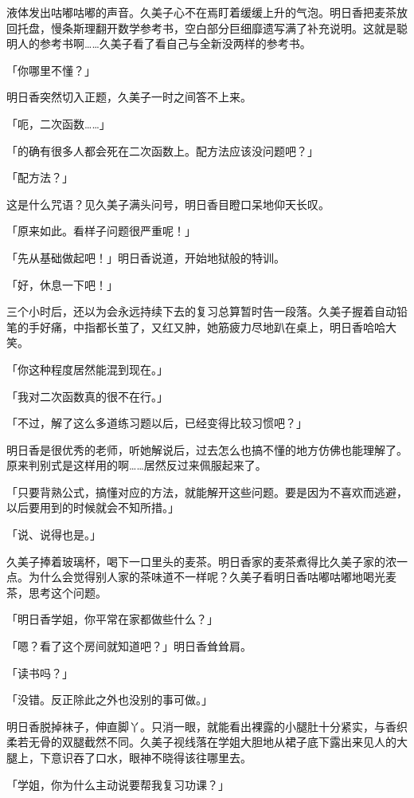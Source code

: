 \documentclass[UTF8]{ctexart}
\begin{document}
    液体发出咕嘟咕嘟的声音。久美子心不在焉盯着缓缓上升的气泡。明日香把麦茶放回托盘，慢条斯理翻开数学参考书，空白部分巨细靡遗写满了补充说明。这就是聪明人的参考书啊……久美子看了看自己与全新没两样的参考书。 

    「你哪里不懂？」 

    明日香突然切入正题，久美子一时之间答不上来。 

    「呃，二次函数……」 

    「的确有很多人都会死在二次函数上。配方法应该没问题吧？」 

    「配方法？」 

    这是什么咒语？见久美子满头问号，明日香目瞪口呆地仰天长叹。 

    「原来如此。看样子问题很严重呢！」 

    「先从基础做起吧！」明日香说道，开始地狱般的特训。 

    「好，休息一下吧！」 

    三个小时后，还以为会永远持续下去的复习总算暂时告一段落。久美子握着自动铅笔的手好痛，中指都长茧了，又红又肿，她筋疲力尽地趴在桌上，明日香哈哈大笑。 

    「你这种程度居然能混到现在。」 

    「我对二次函数真的很不在行。」 

    「不过，解了这么多道练习题以后，已经变得比较习惯吧？」 

    明日香是很优秀的老师，听她解说后，过去怎么也搞不懂的地方仿佛也能理解了。原来判别式是这样用的啊……居然反过来佩服起来了。 

    「只要背熟公式，搞懂对应的方法，就能解开这些问题。要是因为不喜欢而逃避，以后要用到的时候就会不知所措。」 

    「说、说得也是。」 

    久美子捧着玻璃杯，喝下一口里头的麦茶。明日香家的麦茶煮得比久美子家的浓一点。为什么会觉得别人家的茶味道不一样呢？久美子看明日香咕嘟咕嘟地喝光麦茶，思考这个问题。 

    「明日香学姐，你平常在家都做些什么？」 

    「嗯？看了这个房间就知道吧？」明日香耸耸肩。 

    「读书吗？」 

    「没错。反正除此之外也没别的事可做。」 

    明日香脱掉袜子，伸直脚丫。只消一眼，就能看出裸露的小腿肚十分紧实，与香织柔若无骨的双腿截然不同。久美子视线落在学姐大胆地从裙子底下露出来见人的大腿上，下意识吞了口水，眼神不晓得该往哪里去。 

    「学姐，你为什么主动说要帮我复习功课？」 
\end{document}
